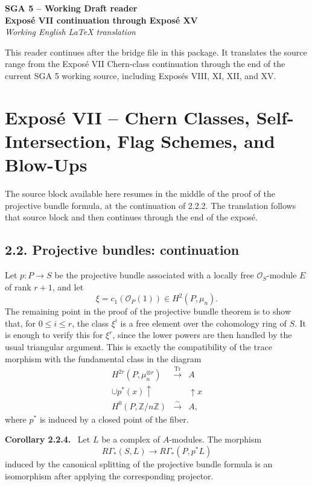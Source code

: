 \documentclass[14pt]{extarticle}
\newcommand{\ZZ}{\mathbb Z}
\newcommand{\Tr}{\operatorname{Tr}}
\newcommand{\cO}{\mathcal O}
\newenvironment{statement}[1]{\par\medskip\noindent\textbf{#1.}\ }{\par\medskip}
\begin{document}
\begin{center}
{\Large \textbf{SGA 5 -- Working Draft reader}}\\[0.4em]
{\large \textbf{Expos\'e VII continuation through Expos\'e XV}}\\[0.3em]
\emph{Working English LaTeX translation}
\end{center}

\bigskip
\noindent This reader continues after the bridge file in this package. It translates the source range from the Expos\'e VII Chern-class continuation through the end of the current SGA 5 working source, including Expos\'es VIII, XI, XII, and XV.

\section*{Expos\'e VII -- Chern Classes, Self-Intersection, Flag Schemes, and Blow-Ups}

\noindent The source block available here resumes in the middle of the proof of the projective bundle formula, at the continuation of 2.2.2. The translation follows that source block and then continues through the end of the expos\'e.

\subsection*{2.2. Projective bundles: continuation}

Let $p:P\to S$ be the projective bundle associated with a locally free $\cO_S$-module $E$ of rank $r+1$, and let
\[
   \xi=c_1(\cO_P(1))\in H^2(P,\mu_n).
\]
The remaining point in the proof of the projective bundle theorem is to show that, for $0\le i\le r$, the class $\xi^i$ is a free element over the cohomology ring of $S$. It is enough to verify this for $\xi^r$, since the lower powers are then handled by the usual triangular argument. This is exactly the compatibility of the trace morphism with the fundamental class in the diagram
\[
\begin{array}{ccc}
H^{2r}(P,\mu_n^{\otimes r}) & \xrightarrow{\Tr} & A \\
\cup p^*(x)\uparrow && \uparrow x \\
H^0(P,\ZZ/n\ZZ) & \xrightarrow{\sim} & A,
\end{array}
\]
where $p^*$ is induced by a closed point of the fiber.

\begin{statement}{Corollary 2.2.4}
Let $L$ be a complex of $A$-modules. The morphism
\[
   R\Gamma_*(S,L)\longrightarrow R\Gamma_*(P,p^*L)
\]
induced by the canonical splitting of the projective bundle formula is an isomorphism after applying the corresponding projector.
\end{statement}
\end{document}
